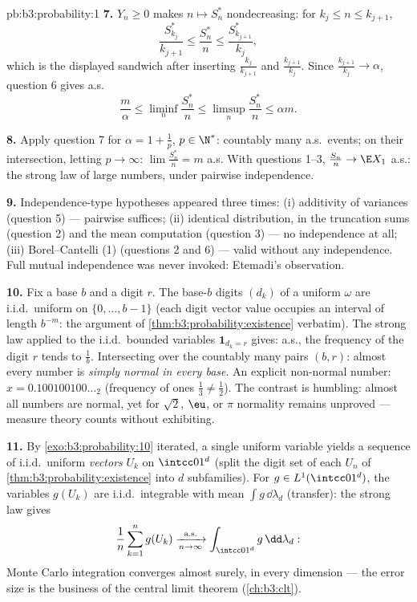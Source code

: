 \begin{solution}{pb:b3:probability:1}
\textbf{7.} $Y_n \geq 0$ makes $n \mapsto S^*_n$
nondecreasing: for $k_j \leq n \leq k_{j+1}$,
\[
\frac{S^*_{k_j}}{k_{j+1}} \leq \frac{S^*_n}{n} \leq
\frac{S^*_{k_{j+1}}}{k_j},
\]
which is the displayed sandwich after inserting
$\frac{k_j}{k_{j+1}}$ and $\frac{k_{j+1}}{k_j}$. Since
$\frac{k_{j+1}}{k_j} \to \alpha$, question 6 gives a.s.
\[
\frac m\alpha \leq \liminf_n\frac{S^*_n}n \leq
\limsup_n\frac{S^*_n}n \leq \alpha m .
\]

\textbf{8.} Apply question 7 for $\alpha = 1 + \frac1p$, $p
\in \N^*$: countably many a.s.\ events; on their
intersection, letting $p \to \infty$: $\lim\frac{S^*_n}n =
m$ a.s. With questions 1--3, $\frac{S_n}n \to \E X_1$
a.s.: the strong law of large numbers, under pairwise
independence.

\textbf{9.} Independence-type hypotheses appeared three
times: (i) additivity of variances (question 5) ---
pairwise suffices; (ii) identical distribution, in the
truncation sums (question 2) and the mean computation
(question 3) --- no independence at all; (iii)
Borel--Cantelli (1) (questions 2 and 6) --- valid without
any independence. Full mutual independence was never
invoked: Etemadi's observation.

\textbf{10.} Fix a base $b$ and a digit $r$. The base-$b$
digits $(d_k)$ of a uniform $\omega$ are i.i.d.\ uniform on
$\{0, \dots, b-1\}$ (each digit vector value occupies an
interval of length $b^{-m}$: the argument of
\cref{thm:b3:probability:existence} verbatim). The strong
law applied to the i.i.d.\ bounded variables $\mathbf
1_{d_k = r}$ gives: a.s., the frequency of the digit $r$
tends to $\frac1b$. Intersecting over the countably many
pairs $(b, r)$: almost every number is
\emph{simply normal in every base}. An explicit non-normal
number: $x = 0.100100100\ldots_2$ (frequency of ones
$\frac13 \neq \frac12$). The contrast is humbling: almost
all numbers are normal, yet for $\sqrt2$, $\eu$, or $\pi$
normality remains unproved --- measure theory counts
without exhibiting.

\textbf{11.} By \cref{exo:b3:probability:10} iterated, a
single uniform variable yields a sequence of i.i.d.\
uniform \emph{vectors} $U_k$ on $\intcc01^d$ (split the
digit set of each $U_n$ of
\cref{thm:b3:probability:existence} into $d$ subfamilies).
For $g \in L^1(\intcc01^d)$, the variables $g(U_k)$ are
i.i.d.\ integrable with mean $\int g\,\dd\lambda_d$
(transfer): the strong law gives
\[
\frac1n\sum_{k=1}^ng(U_k)
\xrightarrow[n\to\infty]{\text{a.s.}}
\int_{\intcc01^d}g\,\dd\lambda_d :
\]
Monte Carlo integration converges almost surely, in every
dimension --- the error size is the business of the central
limit theorem (\cref{ch:b3:clt}).
\end{solution}
